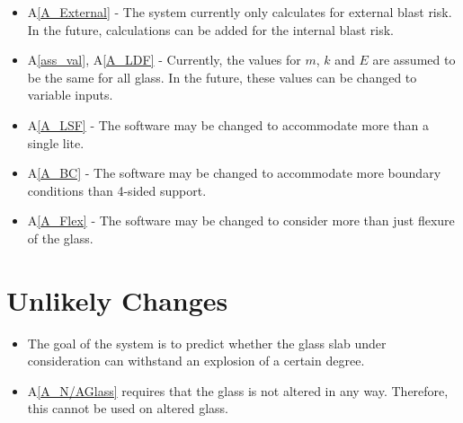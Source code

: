 \documentclass[12pt]{article}
\newcommand{\aref}[1]{A\ref{#1}}
\newcounter{lcnum} %
\newcounter{ucnum} %
\newcommand{\utheucnum}{UC\theucnum}
\begin{document}
\noindent \begin{itemize}

\item[LC\refstepcounter{lcnum}\thelcnum\label{LC_int}:] \aref{A_External} - The
  system currently only calculates for external blast risk. In the future,
  calculations can be added for the internal blast risk.


\item[LC\refstepcounter{lcnum}\thelcnum\label{LC_variables}:] \aref{ass_val},
  \aref{A_LDF} - Currently, the values for $m$, $k$ and $E$ are assumed to be the
  same for all glass.  In the future, these values can be changed to variable
  inputs.

\item[LC\refstepcounter{lcnum}\thelcnum\label{LC_lite}:] \aref{A_LSF} - The
  software may be changed to accommodate more than a single lite.

\item[LC\refstepcounter{lcnum}\thelcnum\label{LC_BC}:] \aref{A_BC} - The
  software may be changed to accommodate more boundary conditions than 4-sided
  support.

\item[LC\refstepcounter{lcnum}\thelcnum\label{LC_Flex}:] \aref{A_Flex} - The
  software may be changed to consider more than just flexure of the glass.


\end{itemize}

\section{Unlikely Changes} \label{sec_unlike}

\noindent \begin{itemize}

\item[\refstepcounter{ucnum} \utheucnum \label{ucGoal}:] The goal of the system
  is to predict whether the glass slab under consideration can withstand an 
  explosion of a certain degree.
\item[\refstepcounter{ucnum} \utheucnum \label{ucN/AGlass}:] \aref{A_N/AGlass}
  requires that the glass is not altered in any way. Therefore, this cannot be
  used on altered glass.

\end{itemize}
\end{document}
